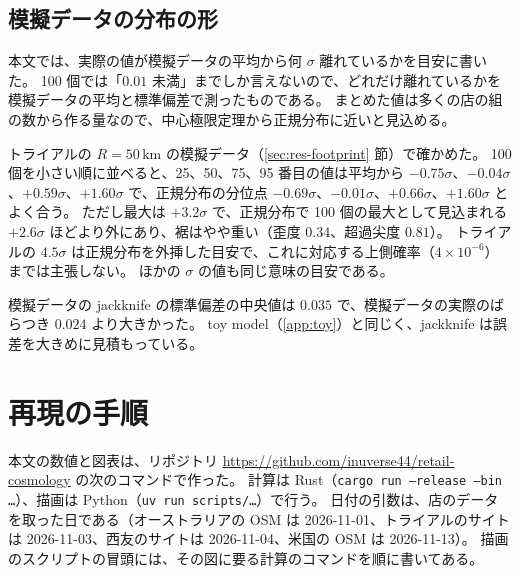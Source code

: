 \documentclass[a4paper,11pt]{ltjsarticle}
\newcommand{\repourl}{https://github.com/inuverse44/retail-cosmology}
\newcommand{\code}[1]{\textcolor{codecolor}{\texttt{#1}}}
\begin{document}
\subsection{模擬データの分布の形}
\label{app:mock-shape}

本文では、実際の値が模擬データの平均から何 $\sigma$ 離れているかを目安に書いた。
100 個では「$0.01$ 未満」までしか言えないので、どれだけ離れているかを模擬データの平均と標準偏差で測ったものである。
まとめた値は多くの店の組の数から作る量なので、中心極限定理から正規分布に近いと見込める。

トライアルの $R = 50\,\mathrm{km}$ の模擬データ（\ref{sec:res-footprint} 節）で確かめた。
100 個を小さい順に並べると、25、50、75、95 番目の値は平均から $-0.75\sigma$、$-0.04\sigma$、$+0.59\sigma$、$+1.60\sigma$ で、正規分布の分位点 $-0.69\sigma$、$-0.01\sigma$、$+0.66\sigma$、$+1.60\sigma$ とよく合う。
ただし最大は $+3.2\sigma$ で、正規分布で 100 個の最大として見込まれる $+2.6\sigma$ ほどより外にあり、裾はやや重い（歪度 $0.34$、超過尖度 $0.81$）。
トライアルの $4.5\sigma$ は正規分布を外挿した目安で、これに対応する上側確率（$4 \times 10^{-6}$）までは主張しない。
ほかの $\sigma$ の値も同じ意味の目安である。

模擬データの jackknife の標準偏差の中央値は $0.035$ で、模擬データの実際のばらつき $0.024$ より大きかった。
toy model（\ref{app:toy}）と同じく、jackknife は誤差を大きめに見積もっている。

\section{再現の手順}
\label{app:repro}

本文の数値と図表は、リポジトリ \url{\repourl} の次のコマンドで作った。
計算は Rust（\code{cargo run --release --bin …}）、描画は Python（\code{uv run scripts/…}）で行う。
日付の引数は、店のデータを取った日である（オーストラリアの OSM は 2026-11-01、トライアルのサイトは 2026-11-03、西友のサイトは 2026-11-04、米国の OSM は 2026-11-13）。
描画のスクリプトの冒頭には、その図に要る計算のコマンドを順に書いてある。
\end{document}
